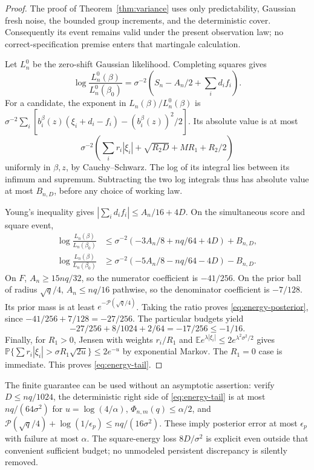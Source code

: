 \documentclass[11pt,reqno]{amsart}
\theoremstyle{remark}\newtheorem{remark}[theorem]{Remark}
\newcommand{\E}{\mathbb E}\newcommand{\Pp}{\mathbb P}
\begin{document}
\begin{proof}
The proof of Theorem~\ref{thm:variance} uses only predictability, Gaussian
fresh noise, the bounded group increments, and the deterministic cover.
Consequently its event remains valid under the present observation law;
no correct-specification premise enters that martingale calculation.

Let $L_n^0$ be the zero-shift Gaussian likelihood. Completing squares gives
\[
 \log\frac{L_n^0(\beta)}{L_n^0(\beta_0)}
 =\sigma^{-2}\left(S_n-A_n/2+\sum_i d_i f_i\right).
\]
For a candidate, the exponent in $L_n(\beta)/L_n^0(\beta)$ is
$\sigma^{-2}\sum_i[b_i^\beta(z)(\xi_i+d_i-f_i)
 -(b_i^\beta(z))^2/2]$. Its absolute value is at most
\[
 \sigma^{-2}\left(\sum_i r_i|\xi_i|+\sqrt{R_2D}+MR_1+R_2/2\right)
\]
uniformly in $\beta,z$, by Cauchy--Schwarz. The log of its integral lies
between its infimum and supremum. Subtracting the two log integrals thus
has absolute value at most $B_{n,D}$, before any choice of working law.

Young's inequality gives
$|\sum_i d_i f_i|\le A_n/16+4D$.
On the simultaneous score and square event,
\begin{align*}
 \log\frac{L_n(\beta)}{L_n(\beta_0)}
 &\le\sigma^{-2}(-3A_n/8+nq/64+4D)+B_{n,D},\\
 \log\frac{L_n(\beta)}{L_n(\beta_0)}
 &\ge\sigma^{-2}(-5A_n/8-nq/64-4D)-B_{n,D}.
\end{align*}
On $F$, $A_n\ge15nq/32$, so the numerator coefficient is $-41/256$.
On the prior ball of radius $\sqrt q/4$, $A_n\le nq/16$ pathwise, so the
denominator coefficient is $-7/128$. Its prior mass is at least
$e^{-\mathcal P(\sqrt q/4)}$. Taking the ratio proves
\eqref{eq:energy-posterior}, since $-41/256+7/128=-27/256$.
The particular budgets yield
\[
 -27/256+8/1024+2/64=-17/256\le-1/16.
\]
Finally, for $R_1>0$, Jensen with weights $r_i/R_1$ and
$\E e^{\lambda|\xi_i|}\le2e^{\lambda^2\sigma^2/2}$ gives
$\Pp\{\sum r_i|\xi_i|>\sigma R_1\sqrt{2u}\}\le2e^{-u}$ by exponential
Markov. The $R_1=0$ case is immediate. This proves \eqref{eq:energy-tail}.
\end{proof}

The finite guarantee can be used without an asymptotic assertion: verify
$D\le nq/1024$, the deterministic right side of \eqref{eq:energy-tail}
is at most $nq/(64\sigma^2)$ for $u=\log(4/\alpha)$,
$\Phi_{n,m}(q)\le\alpha/2$, and
$\mathcal P(\sqrt q/4)+\log(1/\epsilon_p)\le nq/(16\sigma^2)$.
These imply posterior error at most $\epsilon_p$ with failure at most $\alpha$.
The square-energy loss $8D/\sigma^2$ is explicit even outside that convenient
sufficient budget; no unmodeled persistent discrepancy is silently removed.
\end{document}
